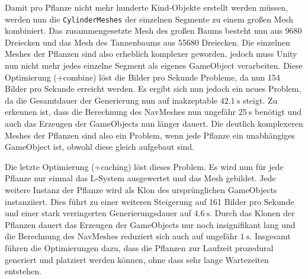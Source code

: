 Damit pro Pflanze nicht mehr hunderte Kind-Objekte erstellt werden müssen, werden nun die \texttt{CylinderMeshes} der einzelnen Segmente zu einem großen Mesh kombiniert.
Das zusammengesetzte Mesh des großen Baums besteht nun aus 9680 Dreiecken und das Mesh des Tannenbaums aus 55680 Dreiecken.
Die einzelnen Meshes der Pflanzen sind also erheblich komplexer geworden, jedoch muss Unity nun nicht mehr jedes einzelne Segment als eigenes GameObject verarbeiten.
Diese Optimierung (+combine) löst die Bilder pro Sekunde Probleme, da nun 154 Bilder pro Sekunde erreicht werden.
Es ergibt sich nun jedoch ein neues Problem, da die Gesamtdauer der Generierung nun auf inakzeptable $\SI{42.1}{\second}$ steigt.
Zu erkennen ist, dass die Berechnung des NavMeshes nun ungefähr $\SI{25}{\second}$ benötigt und auch das Erzeugen der GameObjects nun länger dauert.
Die deutlich komplexeren Meshes der Pflanzen sind also ein Problem, wenn jede Pflanze ein unabhängiges GameObject ist, obwohl diese gleich aufgebaut sind.

Die letzte Optimierung (+caching) löst dieses Problem.
Es wird nun für jede Pflanze nur einmal das L-System ausgewertet und das Mesh gebildet.
Jede weitere Instanz der Pflanze wird als Klon des ursprünglichen GameObjects instanziiert.
Dies führt zu einer weiteren Steigerung auf 161 Bilder pro Sekunde und einer stark verringerten Generierungsdauer auf $\SI{4.6}{\second}$.
Durch das Klonen der Pflanzen dauert das Erzeugen der GameObjects nur noch insignifikant lang und die Berechnung des NavMeshes reduziert sich auch auf ungefähr $\SI{1}{\second}$.
Insgesamt führen die Optimierungen dazu, dass die Pflanzen zur Laufzeit prozedural generiert und platziert werden können, ohne dass sehr lange Wartezeiten entstehen.